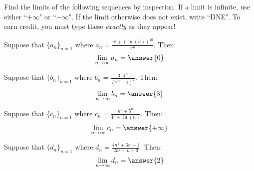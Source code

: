 \documentclass{ximera}
\author{Jim Talamo}
\begin{document}
\begin{exercise}

Find the limits of the following sequences by inspection.  If a limit is infinite, use either ``$+\infty$" or ``$-\infty$".  If the limit otherwise does not exist, write ``DNE".  To earn credit, you must type these \emph{exactly} as they appear!

\begin{exercise}
Suppose that $\{a_n \}_{n=1}$ where $a_n = \frac{n!+(\ln(n) )^{40}}{n^n}$.  Then:
\[
\lim_{n \to \infty} a_n = \answer{0}
\]
\end{exercise}

\begin{exercise}
Suppose that $\{b_n \}_{n=1}$ where $b_n = \frac{3 \cdot 4^n}{(2^n+1)^2}$.  Then:
\[
\lim_{n \to \infty} b_n = \answer{3}
\]

\end{exercise}

\begin{exercise}
Suppose that $\{c_n \}_{n=1}$ where $c_n = \frac{n^2+5^n}{4^n + \ln(n)}$.  Then:
\[
\lim_{n \to \infty} c_n = \answer{+\infty}
\]
\end{exercise}

\begin{exercise}
Suppose that $\{d_n \}_{n=1}$ where $d_n = \frac{4n^2+6n-1}{2n^2-n+3}$.  Then:
\[
\lim_{n \to \infty} d_n =  \answer{2}
\]
\end{exercise}


\end{exercise}
\end{document}
